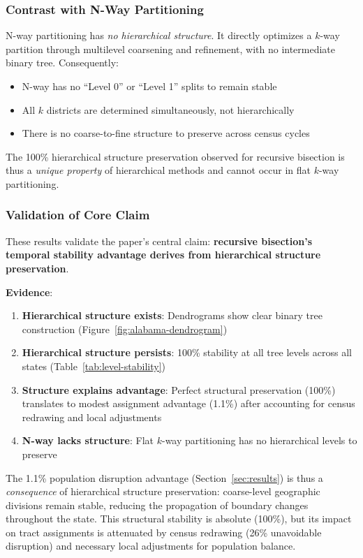 \subsubsection{Contrast with N-Way Partitioning}

N-way partitioning has \textit{no hierarchical structure}. It directly optimizes a $k$-way partition through multilevel coarsening and refinement, with no intermediate binary tree. Consequently:

\begin{itemize}
\item N-way has no ``Level 0'' or ``Level 1'' splits to remain stable
\item All $k$ districts are determined simultaneously, not hierarchically
\item There is no coarse-to-fine structure to preserve across census cycles
\end{itemize}

The 100\% hierarchical structure preservation observed for recursive bisection is thus a \textit{unique property} of hierarchical methods and cannot occur in flat $k$-way partitioning.

\subsubsection{Validation of Core Claim}

These results validate the paper's central claim: \textbf{recursive bisection's temporal stability advantage derives from hierarchical structure preservation}.

\textbf{Evidence}:
\begin{enumerate}
\item \textbf{Hierarchical structure exists}: Dendrograms show clear binary tree construction (Figure~\ref{fig:alabama-dendrogram})
\item \textbf{Hierarchical structure persists}: 100\% stability at all tree levels across all states (Table~\ref{tab:level-stability})
\item \textbf{Structure explains advantage}: Perfect structural preservation (100\%) translates to modest assignment advantage (1.1\%) after accounting for census redrawing and local adjustments
\item \textbf{N-way lacks structure}: Flat $k$-way partitioning has no hierarchical levels to preserve
\end{enumerate}

The 1.1\% population disruption advantage (Section~\ref{sec:results}) is thus a \textit{consequence} of hierarchical structure preservation: coarse-level geographic divisions remain stable, reducing the propagation of boundary changes throughout the state. This structural stability is absolute (100\%), but its impact on tract assignments is attenuated by census redrawing (26\% unavoidable disruption) and necessary local adjustments for population balance.

